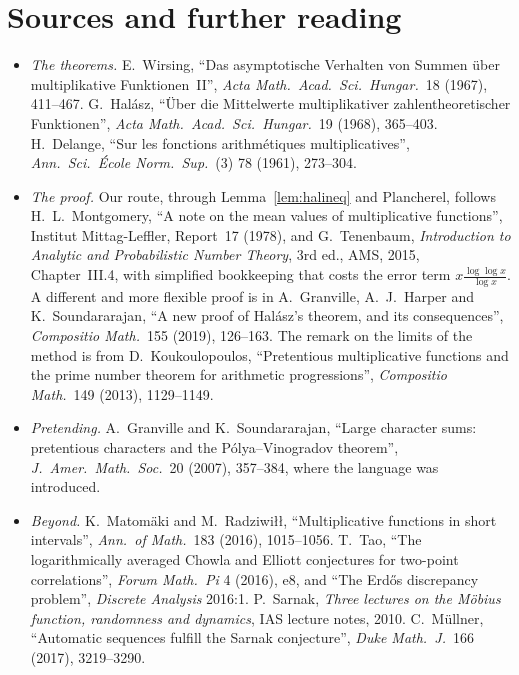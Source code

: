 \section*{Sources and further reading}

\begin{itemize}
\item \emph{The theorems.} E.~Wirsing, ``Das asymptotische Verhalten von Summen über multiplikative Funktionen~II'', \emph{Acta Math.\ Acad.\ Sci.\ Hungar.}\ 18 (1967), 411--467. G.~Halász, ``Über die Mittelwerte multiplikativer zahlentheoretischer Funktionen'', \emph{Acta Math.\ Acad.\ Sci.\ Hungar.}\ 19 (1968), 365--403. H.~Delange, ``Sur les fonctions arithmétiques multiplicatives'', \emph{Ann.\ Sci.\ École Norm.\ Sup.}\ (3) 78 (1961), 273--304.
\item \emph{The proof.} Our route, through Lemma~\ref{lem:halineq} and Plancherel, follows H.~L.~Montgomery, ``A note on the mean values of multiplicative functions'', Institut Mittag-Leffler, Report~17 (1978), and G.~Tenenbaum, \emph{Introduction to Analytic and Probabilistic Number Theory}, 3rd ed., AMS, 2015, Chapter~III.4, with simplified bookkeeping that costs the error term $x\frac{\log\log x}{\log x}$. A different and more flexible proof is in A.~Granville, A.~J.~Harper and K.~Soundararajan, ``A new proof of Halász's theorem, and its consequences'', \emph{Compositio Math.}\ 155 (2019), 126--163. The remark on the limits of the method is from D.~Koukoulopoulos, ``Pretentious multiplicative functions and the prime number theorem for arithmetic progressions'', \emph{Compositio Math.}\ 149 (2013), 1129--1149.
\item \emph{Pretending.} A.~Granville and K.~Soundararajan, ``Large character sums: pretentious characters and the Pólya--Vinogradov theorem'', \emph{J.\ Amer.\ Math.\ Soc.}\ 20 (2007), 357--384, where the language was introduced.
\item \emph{Beyond.} K.~Matomäki and M.~Radziwiłł, ``Multiplicative functions in short intervals'', \emph{Ann.\ of Math.}\ 183 (2016), 1015--1056. T.~Tao, ``The logarithmically averaged Chowla and Elliott conjectures for two-point correlations'', \emph{Forum Math.\ Pi} 4 (2016), e8, and ``The Erdős discrepancy problem'', \emph{Discrete Analysis} 2016:1. P.~Sarnak, \emph{Three lectures on the Möbius function, randomness and dynamics}, IAS lecture notes, 2010. C.~Müllner, ``Automatic sequences fulfill the Sarnak conjecture'', \emph{Duke Math.\ J.}\ 166 (2017), 3219--3290.
\end{itemize}
